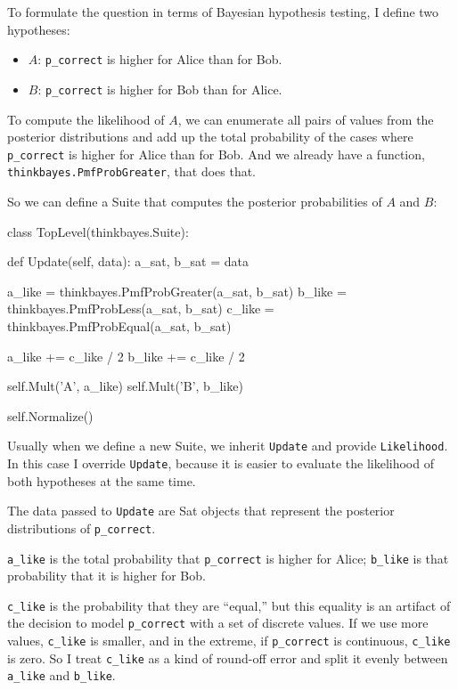 \documentclass[12pt]{book}
\theoremstyle{exercise}
\begin{document}
To formulate the question in terms of Bayesian hypothesis testing,
I define two hypotheses:

\begin{itemize}

\item $A$: \verb"p_correct" is higher for Alice than for Bob.

\item $B$: \verb"p_correct" is higher for Bob than for Alice.

\end{itemize}

To compute the likelihood of $A$, we can enumerate all pairs of values
from the posterior distributions and add up the total probability of
the cases where \verb"p_correct" is higher for Alice than for Bob.
And we already have a function, \verb"thinkbayes.PmfProbGreater",
that does that.

So we can define a Suite that computes the posterior probabilities
of $A$ and $B$:

\begin{code}
class TopLevel(thinkbayes.Suite):

    def Update(self, data):
        a_sat, b_sat = data

        a_like = thinkbayes.PmfProbGreater(a_sat, b_sat)
        b_like = thinkbayes.PmfProbLess(a_sat, b_sat)
        c_like = thinkbayes.PmfProbEqual(a_sat, b_sat)

        a_like += c_like / 2
        b_like += c_like / 2

        self.Mult('A', a_like)
        self.Mult('B', b_like)

        self.Normalize()
\end{code}

Usually when we define a new Suite, we inherit {\tt Update}
and provide {\tt Likelihood}.  In this case I override {\tt Update},
because it is easier to evaluate the likelihood of both
hypotheses at the same time.

The data passed to {\tt Update} are Sat objects that represent
the posterior distributions of \verb"p_correct".

\verb"a_like" is the total probability that
\verb"p_correct" is higher for Alice; \verb"b_like" is that
probability that it is higher for Bob.

\verb"c_like" is the probability that they are ``equal,'' but this
equality is an artifact of the decision to model \verb"p_correct" with
a set of discrete values.  If we use more values, \verb"c_like"
is smaller, and in the extreme, if \verb"p_correct" is
continuous, \verb"c_like" is zero.  So I treat \verb"c_like" as
a kind of round-off error and split it evenly between \verb"a_like"
and \verb"b_like".
\end{document}
